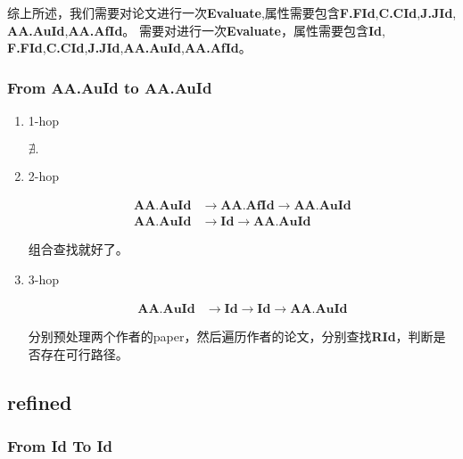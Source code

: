 \documentclass[hyperref,UTF8]{ctexart}
\theoremstyle{definition}
\theoremstyle{remark}
\numberwithin{equation}{subsection}
\newcommand{\Emph}{\textbf}
\newcommand{\Evaluate}{\Emph{Evaluate}}
\newcommand{\Id}{\Emph{Id}}
\newcommand{\RId}{\Emph{RId}}
\newcommand{\FFId}{\Emph{F.FId}}
\newcommand{\CCId}{\Emph{C.CId}}
\newcommand{\JJId}{\Emph{J.JId}}
\newcommand{\AAAuId}{\Emph{AA.AuId}}
\newcommand{\AAAfId}{\Emph{AA.AfId}}
\begin{document}
	综上所述，我们需要对论文进行一次\Evaluate,属性需要包含\FFId,\CCId,\JJId,
    \AAAuId,\AAAfId。
	需要对进行一次\Evaluate，属性需要包含\Id, \FFId,\CCId,\JJId,\AAAuId,\AAAfId。
	
\subsubsection{From \Emph{AA.AuId} to \Emph{AA.AuId}}

	\begin{enumerate}[(1)]
	
		\item 1-hop
		
		$\nexists.$
		
		\item 2-hop
		
		\begin{align}
			\AAAuId &\rightarrow \AAAfId \rightarrow \AAAuId	\label{equ:auid-afid-auid}	\\
			\AAAuId &\rightarrow \Id	\rightarrow \AAAuId		\label{equ:auid-id-auid}
		\end{align}
		
		组合查找就好了。
		
		\item 3-hop
		
		\begin{align}
			\AAAuId &\rightarrow \Id \rightarrow \Id \rightarrow \AAAuId	\label{equ:auid-id-id-auid}
		\end{align}
		
		分别预处理两个作者的paper，然后遍历作者的论文，分别查找\RId，判断是否存在可行路径。
		
	\end{enumerate}
	
\subsection{refined}
\label{subsec:refined}

\subsubsection{From \Emph{Id} To \Emph{Id}}
\end{document}
